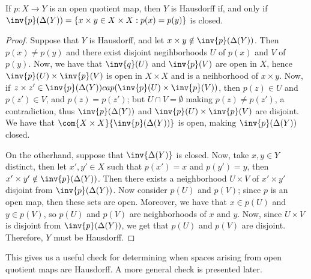 \begin{lemma}\label{2.4.3}
    If $p:X \rightarrow Y$ is an open quotient map, then $Y$ is Hausdorff if,
and only if  $\inv{p}(\Delta(Y))=\{x \times y \in X \times X : p(x)=p(y)\}$ is
closed.
\end{lemma}
\begin{proof}
    Suppose that $Y$ is Hausdorff, and let  $x \times y \notin
    \inv{p}(\Delta(Y))$. Then $p(x) \neq p(y)$ and there exist disjoint
    negihborhoods $U$ of  $p(x)$ and $V$ of  $p(y)$. Now, we have that
    $\inv{q}(U)$ and $\inv{p}(V)$ are open in $X$, hence  $\inv{p}(U) \times
    \inv{p}(V)$ is open in $X \times X$ and is a neihborhood of  $x \times y$.
    Now, if $z \times z' \in \inv{p}(\Delta(Y)) cap (\inv{p}(U) \times
    \inv{p}(V))$, then $p(z) \in U$ and $p(z') \in V$, and $p(z)=p(z')$; but $U
    \cap V=\emptyset$ making $p(z) \neq p(z')$, a contradiction, thus
    $\inv{p}(\Delta(Y))$ and $\inv{p}(U) \times \inv{p}(V)$ are disjoint. We
    have that $\com{X \times X}{\inv{p}(\Delta(Y))}$ is open, making
    $\inv{p}(\Delta(Y))$ closed.

    On the otherhand, suppose that $\inv{\Delta(Y)}$ is closed. Now, take $x,y
    \in Y$ distinct, then let  $x',y' \in X$ such that  $p(x')=x$ and $p(y')=y$,
    then $x' \times y' \notin \inv{p}(\Delta(Y))$. Then there exists a
    neighborhood $U \times V$ of  $x' \times y'$ disjoint from
    $\inv{p}(\Delta(Y))$. Now consider $p(U)$ and $p(V)$; since $p$ is an open
    map, then these sets are open. Moreover, we have that  $x \in p(U)$ and $y
    \in p(V)$, so $p(U)$ and $p(V)$ are neighborhoods of $x$ and  $y$. Now,
    since  $U \times V$ is disjoint from  $\inv{p}(\Delta(Y))$, we get that
    $p(U)$ and $p(V)$ are disjoint. Therefore, $Y$ must be Hausdorff.
\end{proof}
\begin{remark}
    This gives us a useful check for determining when spaces arising from open
    quotient maps are Hausdorff. A more general check is presented later.
\end{remark}

